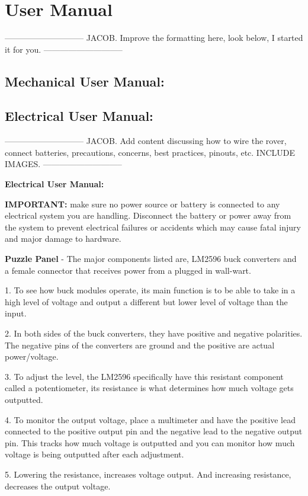 \documentclass[a4paper, 10pt]{article}
\begin{document}
\section{User Manual}
-----------------------------
JACOB. Improve the formatting here, look below, I started it for you.
-----------------------------
	\subsection{Mechanical User Manual:}
	
	\subsection{Electrical User Manual:}
-----------------------------
JACOB. Add content discussing how to wire the rover, connect batteries, precautions, concerns, best practices, pinouts, etc. INCLUDE IMAGES.
-----------------------------
    
\textbf{Electrical User Manual:}

\textbf{IMPORTANT:} make sure no power source or battery is connected to any electrical system you are handling. Disconnect the battery or power away from the system to prevent electrical failures or accidents which may cause fatal injury and major damage to hardware.  

\textbf{Puzzle Panel} - The major components listed are, LM2596 buck converters and a female connector that receives power from a plugged in wall-wart.

1. To see how buck modules operate, its main function is to be able to take in a high level of voltage and output a different but lower level of voltage than the input. 

2. In both sides of the buck converters, they have positive and negative polarities. The negative pins of the converters are ground and the positive are actual power/voltage.  

3. To adjust the level, the LM2596 specifically have this resistant component called a potentiometer, its resistance is what determines how much voltage gets outputted. 

4. To monitor the output voltage, place a multimeter and have the positive lead connected to the positive output pin and the negative lead to the negative output pin. This tracks how much voltage is outputted and you can monitor how much voltage is being outputted after each adjustment.

5. Lowering the resistance, increases voltage output. And increasing resistance, decreases the output voltage. 
\end{document}
